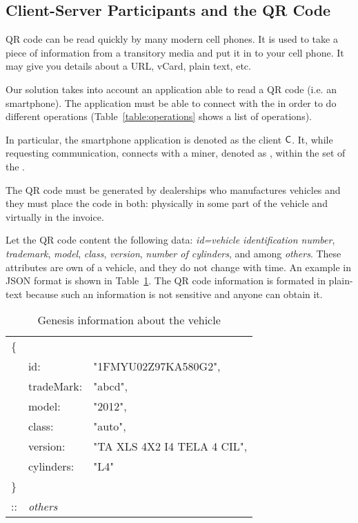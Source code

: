 \subsection{Client-Server Participants and the QR Code}
\label{ssec:clientServer}
QR code can be read quickly by many modern cell phones. It is used to take a piece of 
information from a transitory media and put it in to your cell phone. 
It may give you details about a URL, vCard, plain text, etc.

Our solution takes into account an application able to read a QR code (i.e. an smartphone).
The application must be able to connect with the \blockchaincarnetwork in order
to do different operations (Table~\ref{table:operations} shows a list of operations). 

In particular, the smartphone application is denoted as the client $\textsf{C}$. 
It, while requesting communication, connects with a miner, denoted as \Server, within the set of the \blockchaincarnetwork.


The QR code must be generated by dealerships who manufactures vehicles and they must place the code
in both: physically in some part of the vehicle and virtually in the invoice.

Let the QR code content the following data: 
\textit{id=vehicle identification number}, 
\textit{trademark}, 
\textit{model}, 
\textit{class}, 
\textit{version}, 
\textit{number of cylinders}, and
among \textit{others}. These attributes are own of a vehicle, and they do not 
change with time. An example in JSON format is shown in Table~\ref{table:genesisInfo}.
The QR code information is formated in plain-text because such an information is not sensitive and anyone can obtain it.
\begin{table}[h]
    \centering
    \caption{Genesis information about the vehicle}
    \begin{tabular}{lll}
       \{&         			&    							\\
         & id:        		& "1FMYU02Z97KA580G2", 			\\
         & tradeMark: 		& "abcd", 						\\
         & model:     		& "2012", 						\\
         & class:     		& "auto", 						\\
         & version:   		& "TA XLS 4X2 I4 TELA 4 CIL", 	\\
         & cylinders: 		& "L4" 							\\
       \}& 		        	& 								\\
       ::& \textit{others}	&								\\
    \end{tabular}
    \label{table:genesisInfo}
\end{table}





